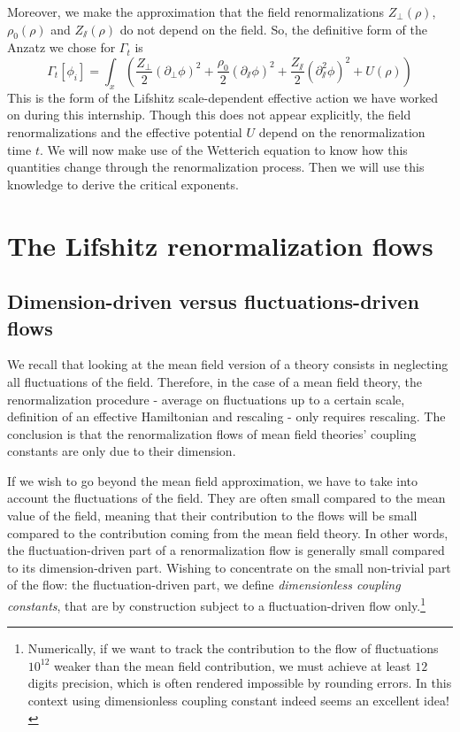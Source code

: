 Moreover, we make the approximation that the field renormalizations $Z_\perp(\rho)$, $\rho_0(\rho)$ and $Z_\sslash(\rho)$ do not depend on the field. So, the definitive form of the Anzatz we chose for $\Gamma_t$ is
\begin{equation}
\label{eq:gamlif}
\Gamma_t[\phi_i] = \int_x \left ( \frac{Z_\perp}{2} (\partial_\perp \phi)^2 + \frac{\rho_0}{2} (\partial_\sslash \phi)^2 + \frac{Z_\sslash}{2} (\partial_\sslash^2 \phi)^2 + U(\rho) \right )
\end{equation}
This is the form of the Lifshitz scale-dependent effective action we have worked on during this internship.
Though this does not appear explicitly, the field renormalizations and the effective potential $U$ depend on the renormalization time $t$. We will now make use of the Wetterich equation to know how this quantities change through the renormalization process. Then we will use this knowledge to derive the critical exponents.

\section{The Lifshitz renormalization flows}

\subsection{Dimension-driven versus fluctuations-driven flows}
We recall that looking at the mean field version of a theory consists in neglecting all fluctuations of the field. Therefore, in the case of a mean field theory, the renormalization procedure - average on fluctuations up to a certain scale, definition of an effective Hamiltonian and rescaling - only requires rescaling. 
The conclusion is that the renormalization flows of mean field theories' coupling constants are only due to their dimension.

If we wish to go beyond the mean field approximation, we have to take into account the fluctuations of the field.
They are often small compared to the mean value of the field, meaning that their contribution to the flows will be small compared to the contribution coming from the mean field theory. In other words, the fluctuation-driven part of a renormalization flow is generally small compared to its dimension-driven part. 
Wishing to concentrate on the small non-trivial part of the flow: the fluctuation-driven part, we define \textit{dimensionless coupling constants}, that are by construction subject to a fluctuation-driven flow only.\footnote{Numerically, if we want to track the contribution to the flow of fluctuations $10^{12}$ weaker than the mean field contribution, we must achieve at least $12$ digits precision, which is often rendered impossible by rounding errors. In this context using dimensionless coupling constant indeed seems an excellent idea!}

